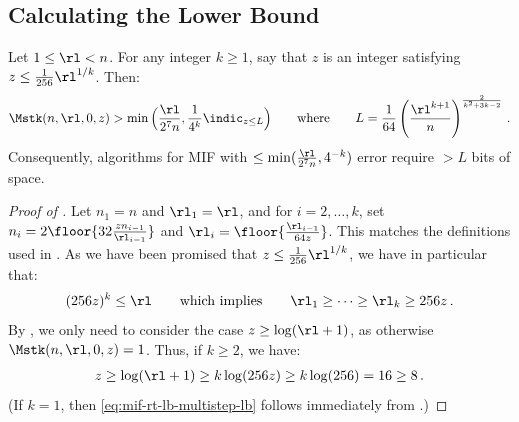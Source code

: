 \begin{itemize}
\begin{itemize}
\subsection{Calculating the Lower Bound}

\begin{lemma}\label{lem:mif-rt-lb-induct}
  Let $1 \le \rl < n$. For any integer $k \ge 1$, say that $z$ is an integer satisfying $z \le \frac{1}{256} \rl^{1 / k}$. Then:
  \begin{align}
    \Mstk(n,\rl,0,z) > \min\Big(\frac{\rl}{2^{7} n}, \frac{1}{4^{k}} \indic_{z \le L}\Big) \qquad \text{where} \qquad L = \frac{1}{64} \left(\frac{\rl^{k + 1}}{n}\right)^{\frac{2}{k^2 + 3 k - 2}} \,. \label{eq:mif-rt-lb-multistep-lb}
  \end{align}
  Consequently, algorithms for MIF with $\le \min(\frac{\rl}{2^{7} n}, 4^{-k})$ error require $> L$ bits of space.
\end{lemma}

\begin{proof}[Proof of ]
  Let $n_1 = n$ and $\rl_1 = \rl$, and for $i=2,\ldots,k$, set $n_i = 2\floor{32 \frac{z n_{i-1}}{\rl_{i-1}}}$ and $\rl_i = \floor{\frac{\rl_{i-1}}{64 z}}$. This matches the definitions used in . As we have been promised that $z \le \frac{1}{256} \rl^{1 / k}$, we have in particular that:
  \begin{align*}
    (256 z)^{k} \le \rl \qquad \text{which implies} \qquad \rl_1 \ge \cdots \ge \rl_k \ge 256 z \,.
  \end{align*}
  By , we only need to consider the case $z \ge \log(\rl+1)$, as otherwise $\Mstk(n,\rl,0,z) = 1$. Thus, if $k \ge 2$, we have:
  \begin{align*}
    z \ge \log(\rl+1) \ge k \log(256 z) \ge k \log(256) = 16 \ge 8 \,.
  \end{align*}
  (If $k=1$, then \cref{eq:mif-rt-lb-multistep-lb} follows immediately from .)


\end{proof}
\end{itemize}
\end{itemize}
